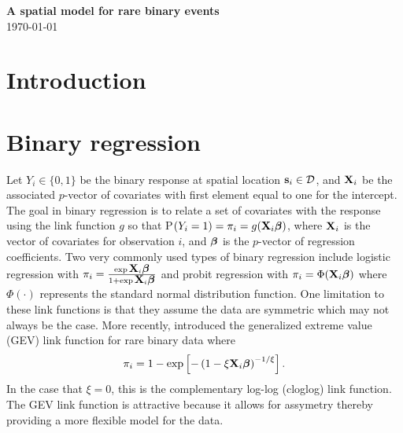 \documentclass[11pt]{article}
\begin{document}
\linenumbers

\begin{center}
{\Large {\bf A spatial model for rare binary events}}\\
\today
\end{center}

\section{Introduction}\label{s:intro}

\section{Binary regression}\label{s:model}
Let $Y_i\in\{0,1\}$ be the binary response at spatial location $\mbox{\bf s}_i \in {\cal D}$, and $\mbox{\bf X}_i$ be the associated $p$-vector of covariates with first element equal to one for the intercept.
The goal in binary regression is to relate a set of covariates with the response using the link function $g$ so that P$(Y_i=1) = \pi_i= g(\mbox{\bf X}_i \mbox{\boldmath $\beta$})$, where $\mbox{\bf X}_i$ is the vector of covariates for observation $i$, and $\mbox{\boldmath $\beta$}$ is the $p$-vector of regression coefficients.
Two very commonly used types of binary regression include logistic regression with $\pi_i = \frac{ \exp{ \mbox{\bf X}_i  \mbox{\boldmath $\beta$}} }{1 + \exp{ \mbox{\bf X}_i  \mbox{\boldmath $\beta$}}}$ and probit regression with $\pi_i = \Phi(\mbox{\bf X}_i \mbox{\boldmath $\beta$})$ where $\Phi(\cdot)$ represents the standard normal distribution function.
One limitation to these link functions is that they assume the data are symmetric which may not always be the case.
More recently, \citet{Wang2010} introduced the generalized extreme value (GEV) link function for rare binary data where
\begin{align} \label{eq:marginalz}
  \pi_i= 1 - \exp \left[-\left(1 - \xi \mbox{\bf X}_i \mbox{\boldmath $\beta$} \right)^{-1 / \xi} \right].
\end{align}
In the case that $\xi = 0$, this is the complementary log-log (cloglog) link function.
The GEV link function is attractive because it allows for assymetry thereby providing a more flexible model for the data.
\end{document}
